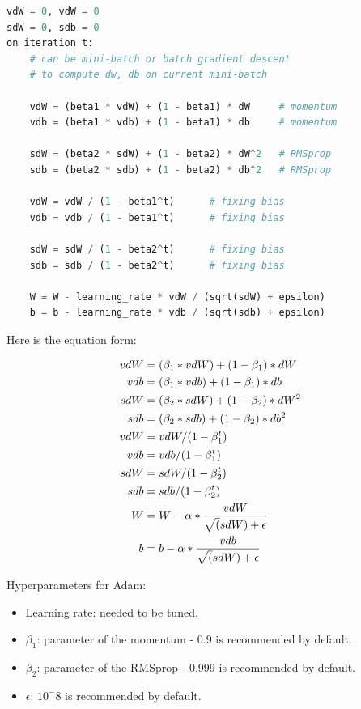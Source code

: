 \begin{lstlisting}[language=python]
vdW = 0, vdW = 0
sdW = 0, sdb = 0
on iteration t:
	# can be mini-batch or batch gradient descent
	# to compute dw, db on current mini-batch                
			
	vdW = (beta1 * vdW) + (1 - beta1) * dW     # momentum
	vdb = (beta1 * vdb) + (1 - beta1) * db     # momentum
			
	sdW = (beta2 * sdW) + (1 - beta2) * dW^2   # RMSprop
	sdb = (beta2 * sdb) + (1 - beta2) * db^2   # RMSprop
			
	vdW = vdW / (1 - beta1^t)      # fixing bias
	vdb = vdb / (1 - beta1^t)      # fixing bias
			
	sdW = sdW / (1 - beta2^t)      # fixing bias
	sdb = sdb / (1 - beta2^t)      # fixing bias
					
	W = W - learning_rate * vdW / (sqrt(sdW) + epsilon)
	b = b - learning_rate * vdb / (sqrt(sdb) + epsilon)
\end{lstlisting}

Here is the equation form:

\begin{equation}
\centering
\begin{aligned}
    vdW &= (\beta_1 * vdW) + (1 - \beta_1) * dW\\
    vdb &= (\beta_1 * vdb) + (1 - \beta_1) * db\\
    sdW &= (\beta_2 * sdW) + (1 - \beta_2) * dW^2\\
    sdb &= (\beta_2 * sdb) + (1 - \beta_2) * db^2\\
    vdW &= vdW / (1 - \beta_1^t)\\
    vdb &= vdb / (1 - \beta_1^t)\\
    sdW &= sdW / (1 - \beta_2^t)\\
    sdb &= sdb / (1 - \beta_2^t)\\
    W &= W - \alpha * \frac{vdW}{\sqrt(sdW) + \epsilon}\\
    b &= b - \alpha * \frac{vdb}{\sqrt(sdW) + \epsilon}
\end{aligned}
\end{equation}

Hyperparameters for Adam:
\begin{itemize}
    \item Learning rate: needed to be tuned.
    \item $\beta_1$: parameter of the momentum - 0.9 is recommended by default.
    \item $\beta_2$: parameter of the RMSprop - 0.999 is recommended by default.
    \item $\epsilon$: $10^-8$ is recommended by default.
\end{itemize}

